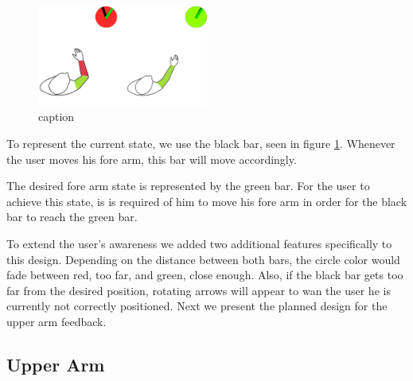 
\begin{figure}[!t]
    \begin{center}
        \includegraphics[width=0.5\textwidth]{imgs/forearmfeedback.png}
    \end{center}
    \caption{caption}
    \label{fig:forearmfeedback}
\end{figure}

To represent the current state, we use the black bar, seen in figure \ref{fig:forearmfeedback}. Whenever the user moves his fore arm, this bar will move accordingly.


The desired fore arm state is represented by the green bar. For the user to achieve this state, is is required of him to move his fore arm in order for the black bar to reach the green bar.


To extend the user's awareness we added two additional features specifically to this design. Depending on the distance between both bars, the circle color would fade between red, too far, and green, close enough. Also, if the black bar gets too far from the desired position, rotating arrows will appear to wan the user he is currently not correctly positioned. Next we present the planned design for the upper arm feedback.


\subsection{Upper Arm}

